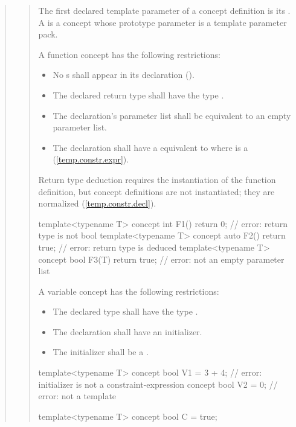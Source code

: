 \begin{quote}
\begin{xremovedblock}
\begin{quote}
\pnum
The first declared template parameter of a concept definition is its
. 
%
A  is a concept whose prototype parameter
is a template parameter pack.

\pnum
A function concept has the following restrictions:
\begin{itemize}
\item No s shall
     appear in its declaration ().

\item The declared return type shall have the type .

\item The declaration's parameter list shall be equivalent to an empty 
      parameter list.

\item The declaration shall have a  equivalent
to  where  is a 
 (\ref{temp.constr.expr}).
\end{itemize}
%
\enternote
Return type deduction requires the instantiation of the function 
definition, but concept definitions are not instantiated; they
are normalized (\ref{temp.constr.decl}).
\exitnote
%
\enterexample
\begin{codeblock}
template<typename T> 
  concept int F1() { return 0; }      // error: return type is not bool
template<typename T> 
  concept auto F2() { return true; }  // error: return type is deduced
template<typename T> 
  concept bool F3(T) { return true; } // error: not an empty parameter list
\end{codeblock}
\exitexample

\pnum
A variable concept has the following restrictions:
\begin{itemize}
\item The declared type shall have the type .
\item The declaration shall have an initializer.
\item The initializer shall be a .
\end{itemize}
%
\enterexample
\begin{codeblock}
template<typename T> 
  concept bool V1 = 3 + 4; // error: initializer is not a constraint-expression
concept bool V2 = 0;       // error: not a template

template<typename T> concept bool C = true;


\end{codeblock}
\end{quote}
\end{xremovedblock}
\end{quote}
